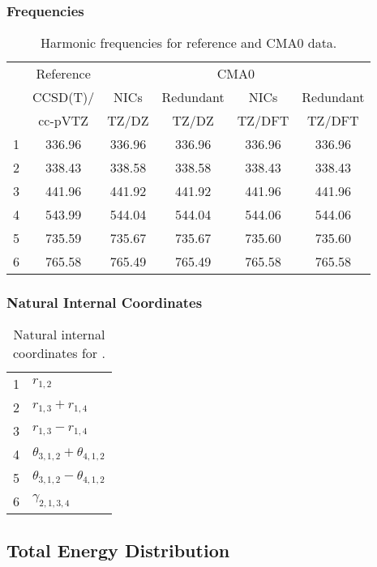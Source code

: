 \documentclass[10pt,oneside]{article}
\begin{document}
\begin{table}[h!]
\subsubsection*{Frequencies}
\centering
\caption{Harmonic frequencies for reference and CMA0 data.}
\begin{tabular}{cccccc}
\toprule
{} & Reference & \multicolumn{4}{c}{CMA0} \\
{} &  CCSD(T)/ &   NICs &  Redundant &   NICs & Redundant \\
{} &   cc-pVTZ &  TZ/DZ &      TZ/DZ & TZ/DFT &    TZ/DFT \\
\midrule
1 &    336.96 & 336.96 &     336.96 & 336.96 &    336.96 \\
2 &    338.43 & 338.58 &     338.58 & 338.43 &    338.43 \\
3 &    441.96 & 441.92 &     441.92 & 441.96 &    441.96 \\
4 &    543.99 & 544.04 &     544.04 & 544.06 &    544.06 \\
5 &    735.59 & 735.67 &     735.67 & 735.60 &    735.60 \\
6 &    765.58 & 765.49 &     765.49 & 765.58 &    765.58 \\
\bottomrule
\end{tabular}
\end{table}

\begin{table}[h!]
\subsubsection*{Natural Internal Coordinates}
\centering
\caption{Natural internal coordinates for .}
\small
\begin{tabular}{ll}
\toprule
  1   & $r_{1,2}$ \\
  2   & $r_{1,3} + r_{1,4}$ \\
  3   & $r_{1,3} - r_{1,4}$ \\
  4   & $\theta_{3,1,2} + \theta_{4,1,2}$ \\
  5   & $\theta_{3,1,2} - \theta_{4,1,2}$ \\
  6   & $\gamma_{2,1,3,4}$ \\
\bottomrule
\end{tabular}
\end{table}

\begin{table}
\subsection*{Total Energy Distribution}
\centering\end{table}
\end{document}
